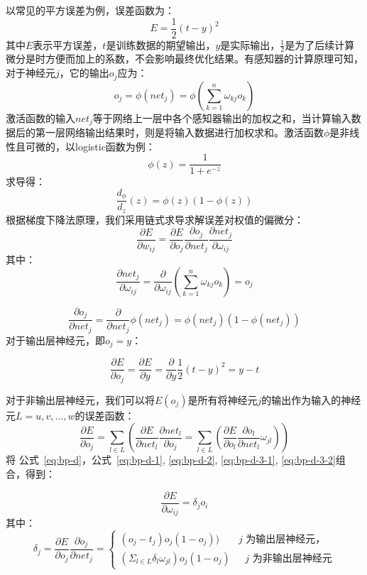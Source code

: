 \documentclass[bachelor,zhspacing]{cqu}  %
\begin{document}
以常见的平方误差为例，误差函数为： \[ E = \frac{1}{2}(t-y)^{2}\]
其中\(E\)表示平方误差，\(t\)是训练数据的期望输出，\(y\)是实际输出，\(\frac{1}{2}\)是为了后续计算微分是时方便而加上的系数，不会影响最终优化结果。有感知器的计算原理可知，对于神经元\(j\)，它的输出\(o_{j}\)应为：
\[o_{j}=\phi(net_{j}) = \phi(\sum_{k = 1}^{n}\omega_{kj}o_{k})\]
激活函数的输入\(net_{j}\)等于网络上一层中各个感知器输出的加权之和，当计算输入数据后的第一层网络输出结果时，则是将输入数据进行加权求和。激活函数\(\phi\)是非线性且可微的，以logistic函数为例：
\[\phi(z) = \frac{1}{1+e^{-z}}\] 求导得：
\[\frac{d_{\phi}}{d_{z}}(z) = \phi(z)(1-\phi(z))\]
根据梯度下降法原理，我们采用链式求导求解误差对权值的偏微分：
\begin{equation}\frac{\partial E}{\partial w_{ij}} = \frac{\partial E}{\partial o_{j}}\frac{\partial o_{j}}{\partial net_{j}}\frac{\partial net_{j}}{\partial \omega_{ij}}\label{eq:bp-d}\end{equation}
其中：
\begin{equation}\frac{\partial net_{j}}{\partial \omega_{ij}} = \frac{\partial}{\partial \omega_{ij}}(\sum_{k = 1}^{n}\omega_{kj}o_{k})=o_{j}\label{eq:bp-d-1}\end{equation}

\begin{equation}\frac{\partial o_{j}}{\partial net_{j}} = \frac{\partial}{\partial net_{j}}\phi(net_{j}) = \phi(net_{j})(1-\phi(net_{j}))\label{eq:bp-d-2}\end{equation}
对于输出层神经元，即\(o_{j} = y\)：

\begin{equation}\frac{\partial E}{\partial o_{j}} = \frac{\partial E}{\partial y} = \frac{\partial}{\partial y}\frac{1}{2}(t-y)^2 = y-t\label{eq:bp-d-3-1}\end{equation}

对于非输出层神经元，我们可以将\(E(o_{j})\)是所有将神经元\(j\)的输出作为输入的神经元\(L = u,v,\ldots,w\)的误差函数：
\begin{equation}\frac{\partial E}{\partial o_{j}} = \sum_{l\in L}(\frac{\partial E}{\partial net_{l}}\frac{\partial net_{l}}{\partial o_{j}} = \sum_{l\in L}(\frac{\partial E}{\partial o_{l}}\frac{\partial o_{l}}{\partial net_{l}}\omega_{jl}))\label{eq:bp-d-3-2}\end{equation}
将
公式~\ref{eq:bp-d}，公式~\ref{eq:bp-d-1}, \ref{eq:bp-d-2}, \ref{eq:bp-d-3-1}, \ref{eq:bp-d-3-2}组合，得到：

\[\frac{\partial E}{\partial \omega_{ij}}= \delta_{j} o_{i}\] 其中：
\begin{equation}
\delta_{j} =\frac{\partial E}{\partial o_{j}} \frac{\partial o_{j}}{\partial net_{j}} = \left\{ \begin{array}{ll}
 (o_{j}-t_{j})o_{j}(1-o_{j})) & \textrm{$j$ 为输出层神经元，}\\
 (\Sigma_{l\in L}\delta_{l}\omega_{jl})o_{j}(1-o_{j}) & \textrm{ $j$ 为非输出层神经元}
  \end{array} \right.
\label{eq:bp-d-delta}\end{equation}
\end{document}
